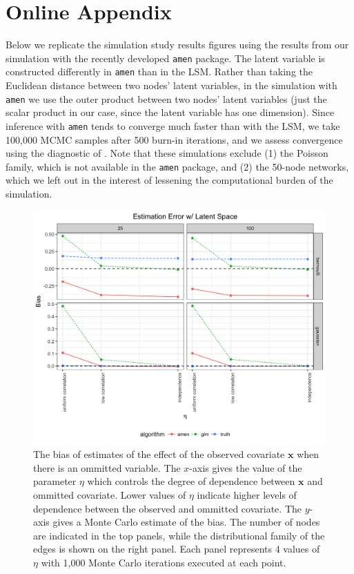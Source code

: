 \documentclass[11pt]{article}
\begin{document}
\newpage
\section*{Online Appendix}
Below we replicate the simulation study results figures using the results from our simulation with the recently developed \texttt{amen} package.  The latent variable is constructed differently in \texttt{amen} than in the LSM.  Rather than
taking the Euclidean distance between two nodes' latent variables, in the simulation with \texttt{amen} we use the outer product between two nodes' latent variables (just the scalar product in our case, since the latent variable has one dimension). Since inference with \texttt{amen} tends to converge much faster than with the LSM, we take 100,000 MCMC
samples after 500 burn-in iterations, and we assess convergence using
the diagnostic of \cite{raftery1992practical}. Note that these simulations exclude (1) the Poisson family, which is not available in the \texttt{amen} package, and (2) the 50-node networks, which we left out in the interest of lessening the computational burden of the simulation.

\begin{figure}
\includegraphics[width=\textwidth]{figures/estimation_ls_amen.png}
\caption{The bias of estimates of the effect of the observed covariate $\mathbf{x}$ when there is an ommitted variable. The $x$-axis gives the value of the parameter $\eta$ which controls the degree of dependence between $\mathbf{x}$ and ommitted covariate. Lower values of $\eta$ indicate higher levels of dependence between the observed and ommitted covariate. The $y$-axis gives a Monte Carlo estimate of the bias. The number of nodes are indicated in the top panels, while the distributional family of the edges is shown on the right panel. Each panel represents 4 values of $\eta$ with 1,000 Monte Carlo iterations executed at each point.
\label{fig:estimation_ls_amen}}
\end{figure}
\end{document}
